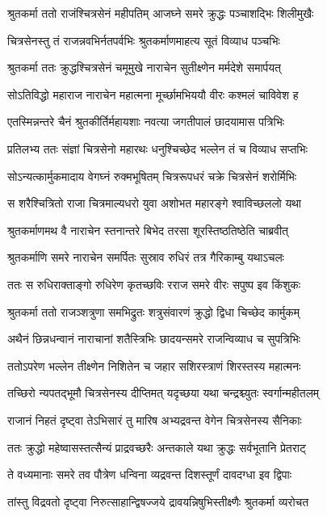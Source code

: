 \twolineshloka
{श्रुतकर्मा ततो राजंश्चित्रसेनं महीपतिम्}
{आजघ्ने समरे क्रुद्धः पञ्चाशद्भिः शिलीमुखैः}


\twolineshloka
{चित्रसेनस्तु तं राजन्नवभिर्नतपर्वभिः}
{श्रुतकर्माणमाहत्य सूतं विव्याध पञ्चभिः}


\twolineshloka
{श्रुतकर्मा ततः क्रुद्धश्चित्रसेनं चमूमुखे}
{नाराचेन सुतीक्ष्णेन मर्मदेशे समार्पयत्}


\twolineshloka
{सोऽतिविद्धो महाराज नाराचेन महात्मना}
{मूर्च्छामभिययौ वीरः कश्मलं चाविवेश ह}


\twolineshloka
{एतस्मिन्नन्तरे चैनं श्रुतकीर्तिर्महायशाः}
{नवत्या जगतीपालं छादयामास पत्रिभिः}


\twolineshloka
{प्रतिलभ्य ततः संज्ञां चित्रसेनो महारथः}
{धनुश्चिच्छेद भल्लेन तं च विव्याध सप्तभिः}


\twolineshloka
{सोऽन्यत्कार्मुकमादाय वेगघ्नं रुक्मभूषितम्}
{चित्ररूपधरं चक्रे चित्रसेनं शरोर्मिभिः}


\twolineshloka
{स शरैश्चित्रितो राजा चित्रमाल्यधरो युवा}
{अशोभत महारङ्गे श्वाविच्छललो यथा}


\twolineshloka
{श्रुतकर्माणमथ वै नाराचेन स्तनान्तरे}
{बिभेद तरसा शूरस्तिष्ठतिष्ठेति चाब्रवीत्}


\twolineshloka
{श्रुतकर्माणि समरे नाराचेन समर्पितः}
{सुस्राव रुधिरं तत्र गैरिकाम्बु यथाऽचलः}


\twolineshloka
{ततः स रुधिराक्ताङ्गो रुधिरेण कृतच्छविः}
{रराज समरे वीरः सपुष्प इव किंशुकः}


\twolineshloka
{श्रुतकर्मा ततो राजञ्शत्रुणा समभिद्रुतः}
{शत्रुसंवारणं क्रुद्धो द्विधा चिच्छेद कार्मुकम्}


\twolineshloka
{अथैनं छिन्नधन्वानं नाराचानां शतैस्त्रिभिः}
{छादयन्समरे राजन्विव्याध च सुपत्रिभिः}


\twolineshloka
{ततोऽपरेण भल्लेन तीक्ष्णेन निशितेन च}
{जहार सशिरस्त्राणं शिरस्तस्य महात्मनः}


\twolineshloka
{तच्छिरो न्यपतद्भूमौ चित्रसेनस्य दीप्तिमत्}
{यदृच्छया यथा चन्द्रश्च्युतः स्वर्गान्महीतलम्}


\twolineshloka
{राजानं निहतं दृष्ट्वा तेऽभिसारं तु मारिष}
{अभ्यद्रवन्त वेगेन चित्रसेनस्य सैनिकाः}


\twolineshloka
{ततः क्रुद्धो महेष्वासस्तत्सैन्यं प्राद्रवच्छरैः}
{अन्तकाले यथा क्रुद्धः सर्वभूतानि प्रेतराट्}


\twolineshloka
{ते वध्यमानाः समरे तव पौत्रेण धन्विना}
{व्यद्रवन्त दिशस्तूर्णं दावदग्धा इव द्विपाः}


\twolineshloka
{तांस्तु विद्रवतो दृष्ट्वा निरुत्साहान्द्विषज्जये}
{द्रावयन्निषुभिस्तीक्ष्णैः श्रुतकर्मा व्यरोचत}


